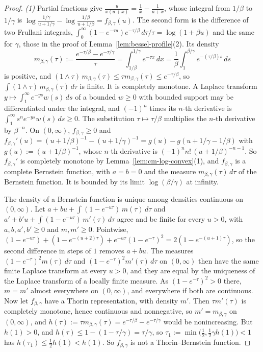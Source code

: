 \begin{proof}
\emph{(1)} Partial fractions give $\frac{u}{x(u + x)} = \frac1x - \frac1{u + x}$, whose integral
from $1/\beta$ to $1/\gamma$ is $\log\frac{1/\gamma}{u + 1/\gamma} - \log\frac{1/\beta}{u + 1/\beta}
= f_{\beta,\gamma}(u)$. The second form is the difference of two Frullani integrals,
$\int_0^\infty(1 - e^{-\tau u})e^{-\tau/\beta}\,d\tau/\tau = \log(1 + \beta u)$ and the same for
$\gamma$, those in the proof of Lemma~\ref{lem:bessel-profile}(2). Its density
\[
  m_{\beta,\gamma}(\tau) := \frac{e^{-\tau/\beta} - e^{-\tau/\gamma}}{\tau}
   = \int_{1/\beta}^{1/\gamma}e^{-\tau x}\,dx
   = \frac1\beta\int_1^{\beta/\gamma}e^{-(\tau/\beta)s}\,ds
\]
is positive, and $(1 \wedge \tau)\,m_{\beta,\gamma}(\tau) \le \tau m_{\beta,\gamma}(\tau) \le
e^{-\tau/\beta}$, so $\int(1 \wedge \tau)\,m_{\beta,\gamma}(\tau)\,d\tau$ is finite. It is completely
monotone. A Laplace transform $y \mapsto \int_1^\infty e^{-ys}w(s)\,ds$ of a bounded $w \ge 0$ with
bounded support may be differentiated under the integral, and $(-1)^n$ times its $n$-th derivative is
$\int_1^\infty s^ne^{-ys}w(s)\,ds \ge 0$. The substitution $\tau \mapsto \tau/\beta$
multiplies the $n$-th derivative by $\beta^{-n}$. On $(0, \infty)$, $f_{\beta,\gamma} \ge 0$ and
$f_{\beta,\gamma}'(u) = (u + 1/\beta)^{-1} - (u + 1/\gamma)^{-1} = g(u) - g(u + 1/\gamma - 1/\beta)$
with $g(u) := (u + 1/\beta)^{-1}$, whose $n$-th derivative is $(-1)^nn!\,(u + 1/\beta)^{-n-1}$. So
$f_{\beta,\gamma}'$ is completely monotone by Lemma~\ref{lem:cm-log-convex}(1), and
$f_{\beta,\gamma}$ is a complete Bernstein function, with $a = b = 0$ and the \Levy{} measure
$m_{\beta,\gamma}(\tau)\,d\tau$ of the Bernstein function. It is bounded by its limit
$\log(\beta/\gamma)$ at infinity.

The density of a Bernstein function is unique among densities continuous on $(0, \infty)$. Let
$a + bu + \int(1 - e^{-u\tau})\,m(\tau)\,d\tau$ and $a' + b'u + \int(1 - e^{-u\tau})\,m'(\tau)\,d\tau$
agree and be finite for every $u > 0$, with $a, b, a', b' \ge 0$ and $m, m' \ge 0$. Pointwise,
$(1 - e^{-u\tau}) + (1 - e^{-(u+2)\tau}) + e^{-u\tau}(1 - e^{-\tau})^2 = 2(1 - e^{-(u+1)\tau})$, so the
second difference in steps of $1$ removes $a + bu$. The measures $(1 - e^{-\tau})^2m(\tau)\,d\tau$ and
$(1 - e^{-\tau})^2m'(\tau)\,d\tau$ on $(0, \infty)$ then have the same finite Laplace transform at
every $u > 0$, and they are equal by the uniqueness of the Laplace transform of a locally finite
measure. As $(1 - e^{-\tau})^2 > 0$ there, $m = m'$ almost everywhere on $(0, \infty)$, and
everywhere if both are continuous. Now let $f_{\beta,\gamma}$ have a Thorin representation, with
density $m'$. Then $\tau m'(\tau)$ is completely monotone, hence continuous and nonnegative, so
$m' = m_{\beta,\gamma}$ on $(0, \infty)$, and $h(\tau) := \tau m_{\beta,\gamma}(\tau) =
e^{-\tau/\beta} - e^{-\tau/\gamma}$ would be nonincreasing. But $h(1) > 0$, and
$h(\tau) \le 1 - (1 - \tau/\gamma) = \tau/\gamma$, so
$\tau_1 := \min\bigl(\tfrac12, \tfrac12\gamma h(1)\bigr) < 1$ has $h(\tau_1) \le \tfrac12h(1) < h(1)$.
So $f_{\beta,\gamma}$ is not a Thorin--Bernstein function.


\end{proof}
